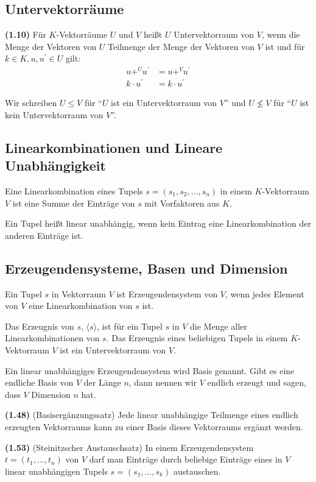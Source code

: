 \documentclass[a4paper,parskip=half*,DIV=15,fontsize=11pt]{scrartcl}
\newlength{\hangwidth}
\newcommand{\skript}[1]{\settowidth{\hangwidth}{\textbf{(#1)} }\hangpara{\hangwidth}{1}\textbf{(#1)} \ignorespaces} %
\begin{document}
\subsection{Untervektorräume}

\skript{1.10} Für $K$-Vektorräume $U$ und $V$ heißt $U$ Untervektorraum von $V$, wenn die Menge der Vektoren von $U$ Teilmenge der Menge der Vektoren von $V$ ist und für $k \in K, u,u^\prime \in U$ gilt:
\begin{align*}
	u {+}^{U} u^\prime &= u {+}^{V} u^\prime	\\
	k \cdot u^\prime &= k \cdot u^\prime
\end{align*}

Wir schreiben $U \leq V$ für ``$U$ ist ein Untervektorraum von $V$'' und $U \nleq V$ für ``$U$ ist kein Untervektorraum von $V$''.

\subsection{Linearkombinationen und Lineare Unabhängigkeit}

Eine Linearkombination eines Tupels $s = (s_1,s_2, \ldots, s_n)$ in einem $K$-Vektorraum $V$ ist eine Summe der Einträge von $s$ mit Vorfaktoren aus $K$.

Ein Tupel heißt linear unabhängig, wenn kein Eintrag eine Linearkombination der anderen Einträge ist.

\subsection{Erzeugendensysteme, Basen und Dimension}

Ein Tupel $s$ in Vektorraum $V$ ist Erzeugendensystem von $V$, wenn jedes Element von $V$ eine Linearkombination von $s$ ist.

Das Erzeugnis von $s$, $\langle s \rangle$, ist für ein Tupel $s$ in $V$ die Menge aller Linearkombinationen von $s$. Das Erzeugnis eines beliebigen Tupels in einem $K$-Vektorraum $V$ ist ein Untervektorraum von $V$.

Ein linear unabhängiges Erzeugendensystem wird Basis genannt. Gibt es eine endliche Basis von $V$ der Länge $n$, dann nennen wir $V$ endlich erzeugt und sagen, dass $V$ Dimension $n$ hat.

\skript{1.48} (Basisergänzungssatz) Jede linear unabhängige Teilmenge eines endlich erzeugten Vektorraums kann zu einer Basis dieses Vektorraums ergänzt werden.

\skript{1.53} (Steinitzscher Austauschsatz) In einem Erzeugendensystem $t=(t_1,\ldots,t_n)$ von $V$ darf man Einträge durch beliebige Einträge eines in $V$ linear unabhängigen Tupels $s = (s_1,\ldots,s_k)$ austauschen. %
\end{document}
